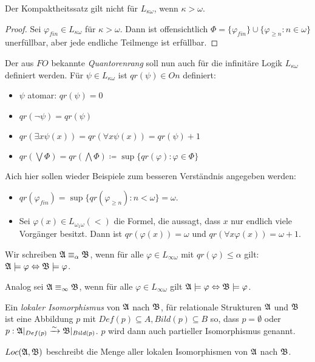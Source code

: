 \begin{satz}
	Der Kompaktheitssatz gilt nicht für $L_{\kappa\omega}$, wenn $\kappa>\omega$.
\end{satz}
\begin{proof}
	Sei $\varphi_{fin}\in L_{\kappa\omega}$ für $\kappa>\omega$. 
	Dann ist offensichtlich $\Phi=\{\varphi_{fin}\}\cup\{\varphi_{\geq n}:n\in\omega\}$ unerfüllbar, aber jede endliche Teilmenge ist erfüllbar.
\end{proof}

\begin{definition}[Quantorenrang]
	Der aus $FO$ bekannte \textit{Quantorenrang} soll nun auch für die infinitäre Logik $L_{\kappa\omega}$ definiert werden. Für $\psi\in L_{\kappa\omega}$ ist $qr(\psi)\in On$ definiert:
	\begin{itemize}
		\item $\psi$ atomar: $qr(\psi)=0$
		\item $qr(\neg\psi)=qr(\psi)$
		\item $qr(\exists x \psi(x))=qr(\forall x \psi(x))=qr(\psi)+1$
		\item $qr(\bigvee \Phi)=qr(\bigwedge \Phi)\coloneqq \sup\{qr(\varphi):\varphi\in \Phi\}$
	\end{itemize}
\end{definition}

Aich hier sollen wieder Beispiele zum besseren Verständnis angegeben werden:
\begin{itemize}
	\item $qr(\varphi_{fin})=\sup\{qr(\varphi_{\geq n}): n < \omega\}=\omega$.
	\item Sei $\varphi(x)\in L_{\omega_1\omega}(<)$ die Formel, die aussagt, dass $x$ nur endlich viele Vorgänger besitzt. Dann ist $qr(\varphi(x))=\omega$ und $qr(\forall x \varphi(x))=\omega+1$.
\end{itemize}

\begin{definition}[Äquivalenzen]
	Wir schreiben $\mathfrak{A}\equiv_\alpha\mathfrak{B}$, wenn für alle $\varphi\in L_{\infty\omega}$ mit $qr(\varphi)\leq \alpha$ gilt: $\mathfrak{A}\models\varphi \Leftrightarrow \mathfrak{B}\models\varphi$.
	
	Analog sei $\mathfrak{A}\equiv_\infty\mathfrak{B}$, wenn für alle $\varphi\in L_{\infty\omega}$ gilt $\mathfrak{A}\models\varphi \Leftrightarrow \mathfrak{B}\models\varphi$.
\end{definition}

\begin{definition}
	Ein \textit{lokaler Isomorphismus} von $\mathfrak{A}$ nach $\mathfrak{B}$, für relationale Strukturen $\mathfrak{A}$ und $\mathfrak{B}$ ist eine Abbildung 
	$p$ mit $Def(p)\subseteq A,Bild(p)\subseteq B$ so, dass $p=\emptyset$ oder
	$p:\mathfrak{A}\vert_{Def(p)}\xrightarrow{\sim}\mathfrak{B}\vert_{Bild(p)}$. 
	$p$ wird dann auch partieller Isomorphismus genannt.
	
	$Loc(\mathfrak{A},\mathfrak{B})$ beschreibt die Menge aller lokalen Isomorphismen von $\mathfrak{A}$ nach $\mathfrak{B}$.
\end{definition}

